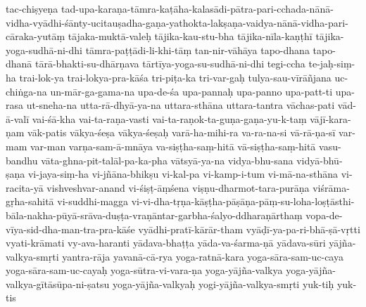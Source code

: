 {{tac-chiṣyeṇa
tad-upa-karaṇa-tāmra-kaṭāha-kalasādi-pātra-pari-cchada-nānā-vidha-vyādhi-śānty-ucitauṣadha-gaṇa-yathokta-lakṣaṇa-vaidya-nānā-vidha-pari-cāraka-yutāṃ
tājaka-muktā-valeḥ
tājika-kau-stu-bha
tājika-nīla-kaṇṭhī
tājika-yoga-sudhā-ni-dhi
tāmra-paṭṭādi-li-khi-tāṃ
tan-nir-vāhāya
tapo-dhana
tapo-dhanā
tārā-bhakti-su-dhārṇava
tārtīya-yoga-su-sudhā-ni-dhi
tegi-ccha
te-jaḥ-siṃ-ha
trai-lok-ya
trai-lokya-pra-kāśa
tri-piṭa-ka
tri-var-gaḥ
tulya-sau-vīrāñjana
uc-chiṅga-na
un-mār-ga-gama-na
upa-de-śa
upa-pannaḥ
upa-panno
upa-patt-ti
upa-rasa
ut-sneha-na
utta-rā-dhyā-ya-na
uttara-sthāna
uttara-tantra
vāchas-pati
vād-ā-valī
vai-śā-kha
vai-ta-raṇa-vasti
vai-ta-raṇok-ta-guṇa-gaṇa-yu-k-taṃ
vājī-kara-ṇam
vāk-patis
vākya-śeṣa
vākya-śeṣaḥ
varā-ha-mihi-ra
va-ra-na-si
vā-rā-ṇa-sī
var-mam
var-man
varṇa-sam-ā-mnāya
va-siṣṭha-saṃ-hitā
vā-siṣṭha-saṃ-hitā
vasu-bandhu
vāta-ghna-pit-talāl-pa-ka-pha
vātsyā-ya-na
vidya-bhu-sana
vidyā-bhū-ṣaṇa
vi-jaya-siṃ-ha
vi-jñāna-bhikṣu
vi-kal-pa
vi-kamp-i-tum
vi-mā-na-sthāna
vi-racita-yā
vishveshvar-anand
vi-śiṣṭ-āṃśena
viṣṇu-dharmot-tara-purāṇa
viśrāma-gṛha-sahitā
vi-suddhi-magga
vi-vi-dha-tṛṇa-kāṣṭha-pāṣāṇa-pāṃ-su-loha-loṣṭāsthi-bāla-nakha-pūyā-srāva-duṣṭa-vraṇāntar-garbha-śalyo-ddharaṇārthaṃ
vopa-de-vīya-sid-dha-man-tra-pra-kāśe
vyādhi-pratī-kārār-tham
vyāḍī-ya-pa-ri-bhā-ṣā-vṛtti
vyati-krāmati
vy-ava-haranti
yādava-bhaṭṭa
yāda-va-śarma-ṇā
yādava-sūri
yājña-valkya-smṛti
yantra-rāja
yavanā-cā-rya
yoga-ratnā-kara
yoga-sāra-sam-uc-caya
yoga-sāra-sam-uc-cayaḥ
yoga-sūtra-vi-vara-ṇa
yoga-yājña-valkya
yoga-yājña-valkya-gītāsūpa-ni-ṣatsu
yoga-yājña-valkyaḥ
yogi-yājña-valkya-smṛti
yuk-tiḥ
yuk-tis
}}
\normalfontlatin%
\endinput
